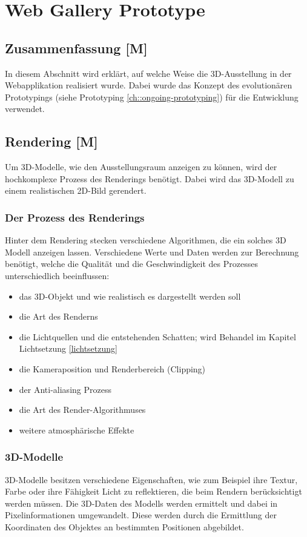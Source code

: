 \section{Web Gallery Prototype}
\subsection{Zusammenfassung [M]} 
In diesem Abschnitt wird erklärt, auf welche Weise die 3D-Ausstellung in der Webapplikation realisiert wurde. Dabei wurde das Konzept des evolutionären Prototypings (siehe Prototyping \ref{ch::ongoing-prototyping}) für die Entwicklung verwendet. 

\subsection{Rendering [M]} 
Um 3D-Modelle, wie den Ausstellungsraum anzeigen zu können, wird der hochkomplexe Prozess des Renderings benötigt. Dabei wird das 3D-Modell zu einem realistischen 2D-Bild gerendert. 
\cite{AdobeRendering} \cite{Rendering3DModels}

\subsubsection{Der Prozess des Renderings}
Hinter dem Rendering stecken verschiedene Algorithmen, die ein solches 3D Modell anzeigen lassen. Verschiedene Werte und Daten werden zur Berechnung benötigt, welche die Qualität und die Geschwindigkeit des Prozesses unterschiedlich beeinflussen:

\begin{itemize}
    \item das 3D-Objekt und wie realistisch es dargestellt werden soll
    \item die Art des Renderns
    \item die Lichtquellen und die entstehenden Schatten; wird Behandel im Kapitel Lichtsetzung \ref{lichtsetzung}
    \item die Kameraposition und Renderbereich (Clipping)
    \item der Anti-aliasing Prozess
    \item die Art des Render-Algorithmuses
    \item weitere atmosphärische Effekte 
    
    
\end{itemize}
\cite{Rendering3DModels}

\subsubsection{3D-Modelle}
3D-Modelle besitzen verschiedene Eigenschaften, wie zum Beispiel ihre Textur, Farbe oder ihre Fähigkeit Licht zu reflektieren, die beim Rendern berücksichtigt werden müssen. Die 3D-Daten des Modells werden ermittelt und dabei in Pixelinformationen umgewandelt. Diese werden durch die Ermittlung der Koordinaten des Objektes an bestimmten Positionen abgebildet. \cite{Rendering3DModels}

